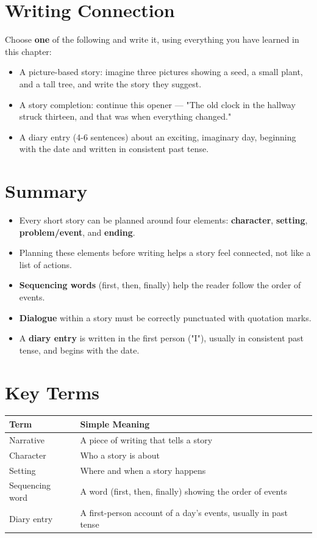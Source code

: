 \section{Writing Connection}
Choose \textbf{one} of the following and write it, using everything you have learned in this chapter:
\begin{itemize}
    \item A picture-based story: imagine three pictures showing a seed, a small plant, and a tall tree, and write the story they suggest.
    \item A story completion: continue this opener — "The old clock in the hallway struck thirteen, and that was when everything changed."
    \item A diary entry (4-6 sentences) about an exciting, imaginary day, beginning with the date and written in consistent past tense.
\end{itemize}

\section{Summary}
\begin{summarybox}
\begin{itemize}
    \item Every short story can be planned around four elements: \textbf{character}, \textbf{setting}, \textbf{problem/event}, and \textbf{ending}.
    \item Planning these elements before writing helps a story feel connected, not like a list of actions.
    \item \textbf{Sequencing words} (first, then, finally) help the reader follow the order of events.
    \item \textbf{Dialogue} within a story must be correctly punctuated with quotation marks.
    \item A \textbf{diary entry} is written in the first person ("I"), usually in consistent past tense, and begins with the date.
\end{itemize}
\end{summarybox}

\section{Key Terms}
\begin{table}[h!]
\centering
\begin{tabular}{|l|p{9cm}|}
\hline
\textbf{Term} & \textbf{Simple Meaning} \\
\hline
Narrative & A piece of writing that tells a story \\
Character & Who a story is about \\
Setting & Where and when a story happens \\
Sequencing word & A word (first, then, finally) showing the order of events \\
Diary entry & A first-person account of a day's events, usually in past tense \\
\hline
\end{tabular}
\end{table}


